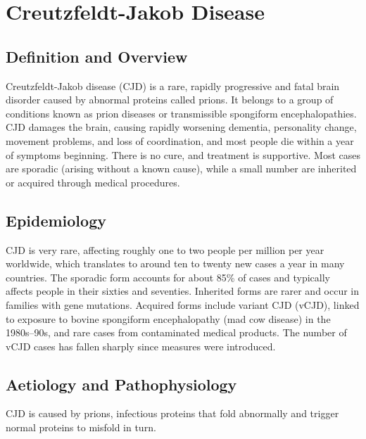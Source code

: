 \chapter{Creutzfeldt-Jakob Disease}

\section*{Definition and Overview}
Creutzfeldt-Jakob disease (CJD) is a rare, rapidly progressive and fatal brain disorder caused by abnormal proteins called prions. It belongs to a group of conditions known as prion diseases or transmissible spongiform encephalopathies. CJD damages the brain, causing rapidly worsening dementia, personality change, movement problems, and loss of coordination, and most people die within a year of symptoms beginning. There is no cure, and treatment is supportive. Most cases are sporadic (arising without a known cause), while a small number are inherited or acquired through medical procedures.

\section*{Epidemiology}
CJD is very rare, affecting roughly one to two people per million per year worldwide, which translates to around ten to twenty new cases a year in many countries. The sporadic form accounts for about 85\% of cases and typically affects people in their sixties and seventies. Inherited forms are rarer and occur in families with gene mutations. Acquired forms include variant CJD (vCJD), linked to exposure to bovine spongiform encephalopathy (mad cow disease) in the 1980s--90s, and rare cases from contaminated medical products. The number of vCJD cases has fallen sharply since measures were introduced.

\section*{Aetiology and Pathophysiology}
CJD is caused by prions, infectious proteins that fold abnormally and trigger normal proteins to misfold in turn.


